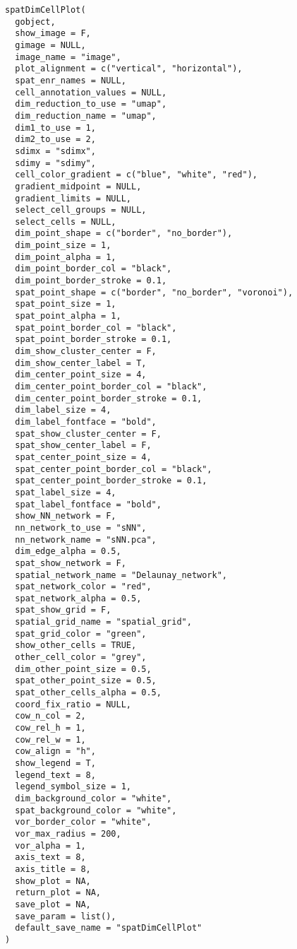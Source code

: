 \documentclass[a4paper]{book}
\begin{document}
%
\begin{Usage}
\begin{verbatim}
spatDimCellPlot(
  gobject,
  show_image = F,
  gimage = NULL,
  image_name = "image",
  plot_alignment = c("vertical", "horizontal"),
  spat_enr_names = NULL,
  cell_annotation_values = NULL,
  dim_reduction_to_use = "umap",
  dim_reduction_name = "umap",
  dim1_to_use = 1,
  dim2_to_use = 2,
  sdimx = "sdimx",
  sdimy = "sdimy",
  cell_color_gradient = c("blue", "white", "red"),
  gradient_midpoint = NULL,
  gradient_limits = NULL,
  select_cell_groups = NULL,
  select_cells = NULL,
  dim_point_shape = c("border", "no_border"),
  dim_point_size = 1,
  dim_point_alpha = 1,
  dim_point_border_col = "black",
  dim_point_border_stroke = 0.1,
  spat_point_shape = c("border", "no_border", "voronoi"),
  spat_point_size = 1,
  spat_point_alpha = 1,
  spat_point_border_col = "black",
  spat_point_border_stroke = 0.1,
  dim_show_cluster_center = F,
  dim_show_center_label = T,
  dim_center_point_size = 4,
  dim_center_point_border_col = "black",
  dim_center_point_border_stroke = 0.1,
  dim_label_size = 4,
  dim_label_fontface = "bold",
  spat_show_cluster_center = F,
  spat_show_center_label = F,
  spat_center_point_size = 4,
  spat_center_point_border_col = "black",
  spat_center_point_border_stroke = 0.1,
  spat_label_size = 4,
  spat_label_fontface = "bold",
  show_NN_network = F,
  nn_network_to_use = "sNN",
  nn_network_name = "sNN.pca",
  dim_edge_alpha = 0.5,
  spat_show_network = F,
  spatial_network_name = "Delaunay_network",
  spat_network_color = "red",
  spat_network_alpha = 0.5,
  spat_show_grid = F,
  spatial_grid_name = "spatial_grid",
  spat_grid_color = "green",
  show_other_cells = TRUE,
  other_cell_color = "grey",
  dim_other_point_size = 0.5,
  spat_other_point_size = 0.5,
  spat_other_cells_alpha = 0.5,
  coord_fix_ratio = NULL,
  cow_n_col = 2,
  cow_rel_h = 1,
  cow_rel_w = 1,
  cow_align = "h",
  show_legend = T,
  legend_text = 8,
  legend_symbol_size = 1,
  dim_background_color = "white",
  spat_background_color = "white",
  vor_border_color = "white",
  vor_max_radius = 200,
  vor_alpha = 1,
  axis_text = 8,
  axis_title = 8,
  show_plot = NA,
  return_plot = NA,
  save_plot = NA,
  save_param = list(),
  default_save_name = "spatDimCellPlot"
)
\end{verbatim}
\end{Usage}
%
\end{document}

